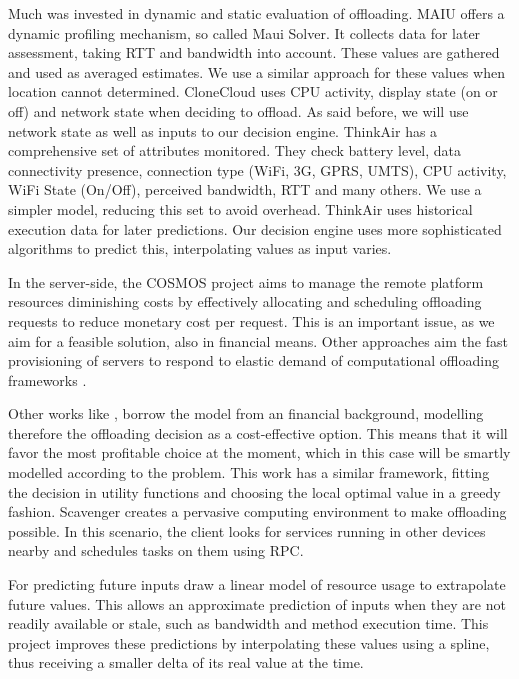 \documentclass[10pt, conference, letterpaper]{IEEEtran}
\begin{document}
  Much was invested in dynamic and static evaluation of offloading. MAIU \cite{Cuervo:2010:MMS:1814433.1814441} offers a dynamic profiling mechanism, so called Maui Solver. It collects data for later assessment, taking RTT and bandwidth into account. These values are gathered and used as averaged estimates. We use a similar approach for these values when location cannot determined. CloneCloud \cite{Chun:2011:CEE:1966445.1966473} uses CPU activity, display state (on or off) and network state when deciding to offload. As said before, we will use network state as well as inputs to our decision engine. ThinkAir \cite{kosta2012thinkair} has a comprehensive set of attributes monitored. They check battery level, data connectivity presence, connection type (WiFi, 3G, GPRS, UMTS), CPU activity, WiFi State (On/Off), perceived bandwidth, RTT and many others. We use a simpler model, reducing this set to avoid overhead. ThinkAir uses historical execution data for later predictions. Our decision engine uses more sophisticated algorithms to predict this, interpolating values as input varies.

  In the server-side, the COSMOS \cite{Shi:2014:CCO:2632951.2632958} project aims to manage the remote platform resources diminishing costs by effectively allocating and scheduling offloading requests to reduce monetary cost per request. This is an important issue, as we aim for a feasible solution, also in financial means. Other approaches aim the fast provisioning of servers to respond to elastic demand of computational offloading frameworks \cite{Ha:2013:JPC:2462456.2464451}.

  Other works like \cite{6162380}, borrow the model from an financial background, modelling therefore the offloading decision as a cost-effective option. This means that it will favor the most profitable choice at the moment, which in this case will be smartly modelled according to the problem. This work has a similar framework, fitting the decision in utility functions and choosing the local optimal value in a greedy fashion. Scavenger \cite{5466972} creates a pervasive computing environment to make offloading possible. In this scenario, the client looks for services running in other devices nearby and schedules tasks on them using RPC.

  For predicting future inputs \cite{Balan:2003:TRE:1066116.1066125} \cite{Cuervo:2010:MMS:1814433.1814441} \cite{kosta2012thinkair} draw a linear model of resource usage to extrapolate future values. This allows an approximate prediction of inputs when they are not readily available or stale, such as bandwidth and method execution time. This project improves these predictions by interpolating these values using a spline, thus receiving a smaller delta of its real value at the time.
\end{document}
